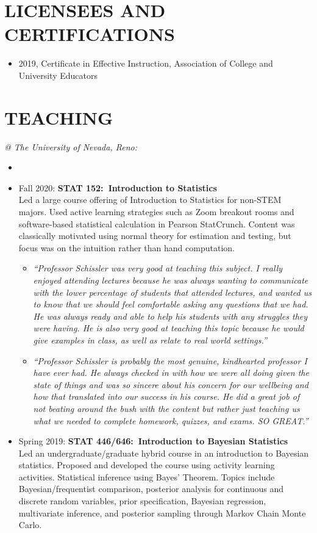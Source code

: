 \documentclass[paper=a4,fontsize=11pt]{scrartcl} %
\newcommand{\NewPart}[2]{\section*{\uppercase{#1} #2 }}
\newcommand{\CourseEntry}[3]{
		\noindent \item{#1: \textbf{#2} \\ #3}}
\begin{document}

\NewPart{Licensees and Certifications}{}
\vspace{-7pt}

\begin{itemize}[noitemsep]
    \item 2019, Certificate in Effective Instruction, Association of College and University Educators
\end{itemize}


\NewPart{Teaching}{}
\vspace{-7pt}
\textit{@ The University of Nevada, Reno:}
\begin{itemize}[noitemsep]
\item[]
\vspace{-15pt}

\CourseEntry{Fall 2020}{STAT 152:~Introduction to Statistics}{Led a large course offering of Introduction to Statistics for non-STEM majors. Used active learning strategies such as Zoom breakout rooms and software-based statistical calculation in Pearson StatCrunch. Content was classically motivated using normal theory for estimation and testing, but focus was on the intuition rather than hand computation.

\begin{itemize}
\item \emph{\small{``Professor Schissler was very good at teaching this subject. I really enjoyed attending lectures because he was always wanting to communicate with the lower percentage of students that attended lectures, and wanted us to know that we should feel comfortable asking any questions that we had. He was always ready and able to help his students with any struggles they were having. He is also very good at teaching this topic because he would give examples in class, as well as relate to real world settings.''}}
\item \emph{\small{``Professor Schissler is probably the most genuine, kindhearted professor I have ever had. He always checked in with how we were all doing given the state of things and was so sincere about his concern for our wellbeing and how that translated into our success in his course. He did a great job of not beating around the bush with the content but rather just teaching us what we needed to complete homework, quizzes, and exams. SO GREAT.''}}
\end{itemize}
}{} 

\CourseEntry{Spring 2019}{STAT 446/646:~Introduction to Bayesian Statistics}{Led an undergraduate/graduate hybrid course in an introduction to Bayesian statistics. Proposed and developed the course using activity learning activities. Statistical inference using Bayes’ Theorem. Topics include Bayesian/frequentist comparison, posterior analysis for continuous and discrete random variables, prior specification, Bayesian regression, multivariate inference, and posterior sampling through Markov Chain Monte Carlo.

}
\end{itemize}
\end{document}
